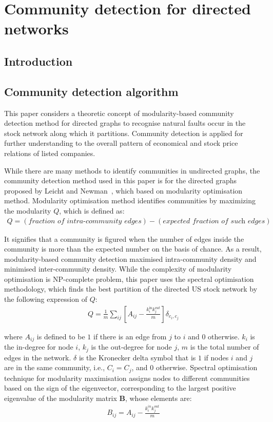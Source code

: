 \chapter{Community detection for directed networks}
\section{Introduction}

\section{Community detection algorithm}
This paper considers a theoretic concept of modularity-based community detection method for directed graphs to recognise natural faults occur in the stock network along which it partitions. Community detection is applied for further understanding to the overall pattern of economical and stock price relations of listed companies.

While there are many methods to identify communities in undirected graphs, the community detection method used in this paper is for the directed graphs proposed by Leicht and Newman~\cite{PhysRevLett.100.118703}, which based on modularity optimisation method. Modularity optimisation method identifies communities by maximizing the modularity $Q$, which is defined as:
\begin{eqnarray}
Q=(\textit{fraction of intra-community edges}) - (\textit{expected fraction of such edges})
\end{eqnarray}

It signifies that a community is figured when the number of edges inside the community is more than the expected number on the basis of chance. As a result, modularity-based community detection maximised intra-community density and minimised inter-community density. While the complexity of modularity optimisation is NP-complete problem, this paper uses the spectral optimisation methodology, which finds the best partition of the directed US stock network by the following expression of $Q$:
\begin{eqnarray}
Q=\frac{1}{m}\sum_{ij}{\left[A_{ij}-\frac{k_i^{\text{in}}k_j^{out}}{m}\right]}\delta_{c_i,c_j}
\end{eqnarray}

where $A_{ij}$ is defined to be $1$ if there is an edge from $j$ to $i$ and $0$ otherwise. $k_i$ is the in-degree for node $i$, $k_j$ is the out-degree for node $j$, $m$ is the total number of edges in the network. $\delta$ is the Kronecker delta symbol that is $1$ if nodes $i$ and $j$ are in the same community, i.e., $C_i=C_j$, and $0$ otherwise. Spectral optimisation technique for modularity maximisation assigns nodes to different communities based on the sign of the eigenvector, corresponding to the largest positive eigenvalue of the modularity matrix \textbf{B}, whose elements are:
\begin{eqnarray}
B_{ij}=A_{ij}-\frac{k_i^{in}k_j^{out}}{m}
\end{eqnarray}

